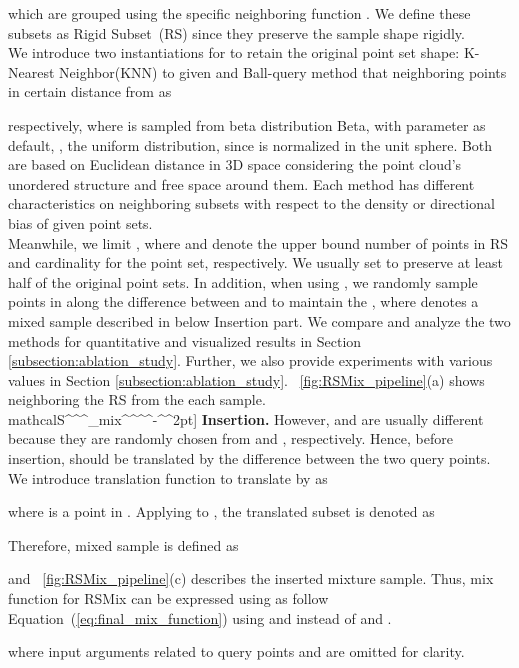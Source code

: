 \documentclass[final]{cvpr}
\begin{document}
which are grouped using the specific neighboring function . We define these subsets as Rigid Subset~(RS) since they preserve the sample shape rigidly. \\
\indent We introduce two instantiations for  to retain the original point set shape: K-Nearest Neighbor(KNN) to given  and Ball-query method that neighboring points in certain distance  from  as 

respectively, where  is sampled from beta distribution Beta, with parameter  as default, \ie, the uniform distribution, since  is normalized in the unit sphere. Both  are based on Euclidean distance in 3D space considering  the point cloud's unordered structure and free space around them. Each method has different characteristics on neighboring subsets with respect to the density or directional bias of given point sets. \\
\indent Meanwhile, we limit   , where  and  denote the upper bound number of points in RS and cardinality for the point set, respectively. We usually set  to preserve at least half of the original point sets. In addition, when using , we randomly sample points in  along the difference between  and  to maintain the , where  denotes a mixed sample described in below Insertion part. We compare and analyze the two methods for quantitative and visualized results in Section \ref{subsection:ablation_study}. Further, we also provide experiments with various  values in Section \ref{subsection:ablation_study}. \figurename~\ref{fig:RSMix_pipeline}(a) shows neighboring the RS from the each sample.\\mathcal{S}^{\alpha}^{\beta}^{\alpha}_{mix}^{\alpha}^{\alpha}^{\beta}^{\alpha}-^{\alpha}^{\beta}2pt]
\noindent \textbf{Insertion.} However,  and  are usually different because they are randomly chosen from  and , respectively. Hence, before insertion,  should be translated by the difference between the  two query points. We introduce translation function  to translate  by  as 

where  is a point in . Applying  to , the translated subset  is denoted as

Therefore, mixed sample  is defined as 

and \figurename~\ref{fig:RSMix_pipeline}(c) describes the inserted mixture sample. Thus, mix function  for RSMix can be expressed using as follow Equation~(\ref{eq:final_mix_function}) using  and  instead of  and .

where input arguments related to query points  and  are omitted for clarity.
\end{document}
